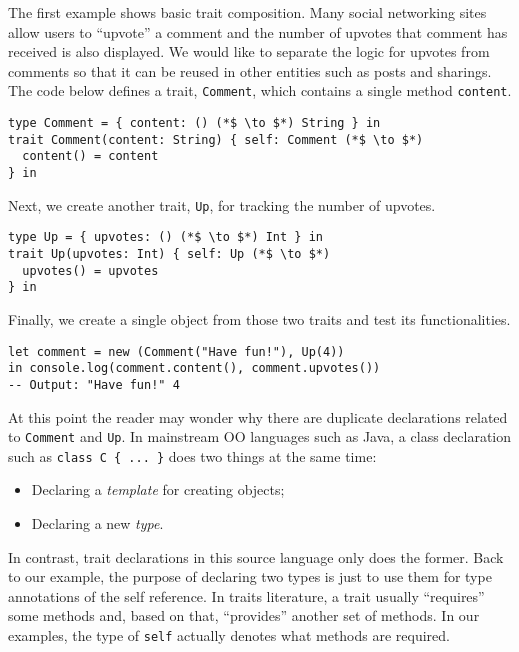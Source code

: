 The first example shows basic trait composition. Many social networking sites
allow users to ``upvote'' a comment and the number of upvotes that comment has
received is also displayed. We would like to separate the logic for upvotes from
comments so that it can be reused in other entities such as posts and sharings.
The code below defines a trait, \lstinline$Comment$, which
contains a single method \lstinline$content$.

\begin{lstlisting}
type Comment = { content: () (*$ \to $*) String } in
trait Comment(content: String) { self: Comment (*$ \to $*)
  content() = content
} in
\end{lstlisting}

\noindent Next, we create another trait, \lstinline$Up$, for tracking the number
of upvotes.

\begin{lstlisting}
type Up = { upvotes: () (*$ \to $*) Int } in
trait Up(upvotes: Int) { self: Up (*$ \to $*)
  upvotes() = upvotes
} in
\end{lstlisting}

\noindent Finally, we create a single object from those two traits and test its
functionalities.

\begin{lstlisting}
let comment = new (Comment("Have fun!"), Up(4))
in console.log(comment.content(), comment.upvotes())
-- Output: "Have fun!" 4
\end{lstlisting}


At this point the reader may wonder why there are duplicate declarations related
to \lstinline$Comment$ and \lstinline$Up$. In mainstream OO languages such as
Java, a class declaration such as \lstinline$class C { ... }$ does two things at
the same time:

\begin{itemize}
\item Declaring a \emph{template} for creating objects;
\item Declaring a new \emph{type}.
\end{itemize}

\noindent In contrast, trait declarations in this source language only does the
former. Back to our example, the purpose of declaring two types is just to use
them for type annotations of the self reference.  In traits literature, a trait
usually ``requires'' some methods and, based on that,  ``provides'' another set
of methods. In our examples, the type of \lstinline$self$ actually denotes what
methods are required.

